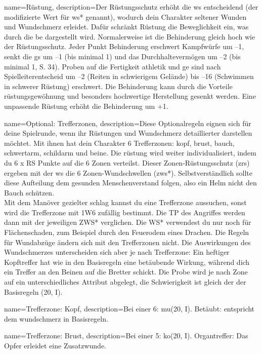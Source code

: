 {
    name={Rüstung},
description={Der Rüstungsschutz erhöht die \gls{ws} entscheidend (der modifizierte Wert für \gls{ws}* genannt), wodurch dein Charakter seltener Wunden und Wundschmerz erleidet. Dafür schränkt Rüstung die Beweglichkeit ein, was durch die \gls{be} dargestellt wird. Normalerweise ist die Behinderung gleich hoch wie der Rüstungsschutz. Jeder Punkt Behinderung erschwert Kampfwürfe um –1, senkt die \gls{gs} um –1 (bis minimal 1) und das Durchhaltevermögen um –2 (bis minimal 1, S. 34). Proben auf die Fertigkeit \gls{athletik} und \gls{ge} sind nach Spielleiterentscheid um –2 (Reiten in schwierigem Gelände) bis –16 (Schwimmen in schwerer Rüstung) erschwert. Die Behinderung kann durch die Vorteile \gls{rüstungsgewöhnung} und besonders hochwertige Herstellung gesenkt werden. Eine unpassende Rüstung erhöht die Behinderung um +1.}}

{
    name={Optional: Trefferzonen},
    description={Diese Optionalregeln eignen sich für deine Spielrunde, wenn ihr Rüstungen und Wundschmerz detaillierter darstellen möchtet. Mit ihnen hat dein Charakter 6 Trefferzonen: \gls{kopf}, \gls{brust}, \gls{bauch}, \gls{schwertarm}, \gls{schildarm} und \gls{beine}. Die \gls{rüstung} wird weiter individualisiert, indem du 6 x RS Punkte auf die 6 Zonen verteilst. Dieser Zonen-Rüstungsschutz (\gls{zrs}) ergeben mit der \gls{ws} die 6 Zonen-Wundschwellen (\gls{zws}*). Selbstverständlich sollte diese Aufteilung dem gesunden Menschenverstand folgen, also ein Helm nicht den Bauch schützen.\\
Mit dem Manöver \gls{gezielter schlag} kannst du eine Trefferzone aussuchen, sonst wird die Trefferzone mit 1W6 zufällig bestimmt. Die TP des Angriffes werden dann mit der jeweiligen ZWS* verglichen. Die WS* verwendest du nur noch für Flächenschaden, zum Beispiel durch den Feuerodem eines Drachen. Die Regeln für Wundabzüge ändern sich mit den Trefferzonen nicht. Die Auswirkungen des Wundschmerzes unterscheiden sich aber je nach Trefferzone: Ein heftiger Kopftreffer hat wie in den Basisregeln eine betäubende Wirkung, während dich ein Treffer an den Beinen auf die Bretter schickt. Die Probe wird je nach Zone auf ein unterschiedliches Attribut abgelegt, die Schwierigkeit ist gleich der der Basisregeln (20, I).}}

{
    name={Trefferzone: Kopf},
    description={Bei einer 6: \gls{mu}(20, I). Betäubt: entspricht dem \gls{wundschmerz} in Basisregeln.}}

{
    name={Trefferzone: Brust},
    description={Bei einer 5: \gls{ko}(20, I). Organtreffer: Das Opfer erleidet eine Zusatzwunde.}}

